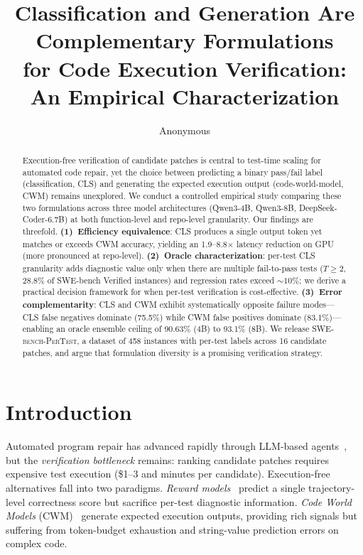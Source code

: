 \documentclass[11pt,a4paper]{article}
\title{Classification and Generation Are Complementary Formulations\\for Code Execution Verification: An Empirical Characterization}
\author{Anonymous}
\begin{document}
\maketitle

\begin{abstract}
Execution-free verification of candidate patches is central to test-time scaling for automated code repair, yet the choice between predicting a binary pass/fail label (classification, CLS) and generating the expected execution output (code-world-model, CWM) remains unexplored.
We conduct a controlled empirical study comparing these two formulations across three model architectures (Qwen3-4B, Qwen3-8B, DeepSeek-Coder-6.7B) at both function-level and repo-level granularity.
Our findings are threefold.
\textbf{(1)~Efficiency equivalence}: CLS produces a single output token yet matches or exceeds CWM accuracy, yielding an 1.9--8.8$\times$ latency reduction on GPU (more pronounced at repo-level).
\textbf{(2)~Oracle characterization}: per-test CLS granularity adds diagnostic value only when there are multiple fail-to-pass tests ($T\!\ge\!2$, 28.8\% of SWE-bench Verified instances) and regression rates exceed $\sim\!10$\%; we derive a practical decision framework for when per-test verification is cost-effective.
\textbf{(3)~Error complementarity}: CLS and CWM exhibit systematically opposite failure modes---CLS false negatives dominate (75.5\%) while CWM false positives dominate (83.1\%)---enabling an oracle ensemble ceiling of 90.63\% (4B) to 93.1\% (8B).
We release \textsc{SWE-bench-PerTest}, a dataset of 458 instances with per-test labels across 16 candidate patches, and argue that formulation diversity is a promising verification strategy.
\end{abstract}

\section{Introduction}

Automated program repair has advanced rapidly through LLM-based agents~\cite{jimenez2024swebench,zhang2024autocoderover}, but the \emph{verification bottleneck} remains: ranking candidate patches requires expensive test execution (\$1--3 and minutes per candidate).
Execution-free alternatives fall into two paradigms.
\emph{Reward models}~\cite{zhang2025swerm} predict a single trajectory-level correctness score but sacrifice per-test diagnostic information.
\emph{Code World Models} (CWM)~\cite{gu2024cruxeval} generate expected execution outputs, providing rich signals but suffering from token-budget exhaustion and string-value prediction errors on complex code.
\end{document}

